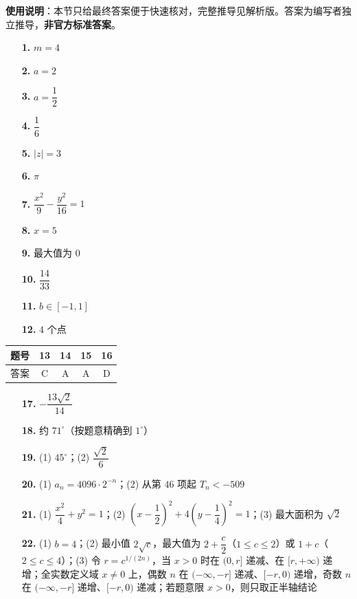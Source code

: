 
\begin{gknotice}
\textbf{使用说明}：本节只给最终答案便于快速核对，完整推导见解析版。答案为编写者独立推导，\textbf{非官方标准答案}。
\end{gknotice}

\begin{itemize}[leftmargin=2.6em]
  \item[\textbf{1.}] $m=4$
  \item[\textbf{2.}] $a=2$
  \item[\textbf{3.}] $a=\dfrac12$
  \item[\textbf{4.}] $\dfrac16$
  \item[\textbf{5.}] $|z|=3$
  \item[\textbf{6.}] $\pi$
  \item[\textbf{7.}] $\dfrac{x^2}{9}-\dfrac{y^2}{16}=1$
  \item[\textbf{8.}] $x=5$
  \item[\textbf{9.}] 最大值为 $0$
  \item[\textbf{10.}] $\dfrac{14}{33}$
  \item[\textbf{11.}] $b\in[-1,1]$
  \item[\textbf{12.}] $4$ 个点
\end{itemize}

\begin{center}\begin{tabular}{ccccc}
\toprule
题号 & 13 & 14 & 15 & 16 \\
\midrule
答案 & C & A & A & D \\
\bottomrule
\end{tabular}\end{center}

\begin{itemize}[leftmargin=2.6em]
  \item[\textbf{17.}] $-\dfrac{13\sqrt2}{14}$
  \item[\textbf{18.}] 约 $71^\circ$（按题意精确到 $1^\circ$）
  \item[\textbf{19.}] (1) $45^\circ$；(2) $\dfrac{\sqrt2}{6}$
  \item[\textbf{20.}] (1) $a_n=4096\cdot2^{-n}$；(2) 从第 $46$ 项起 $T_n<-509$
  \item[\textbf{21.}] (1) $\dfrac{x^2}{4}+y^2=1$；(2) $\left(x-\dfrac12\right)^2+4\left(y-\dfrac14\right)^2=1$；(3) 最大面积为 $\sqrt2$
  \item[\textbf{22.}] (1) $b=4$；(2) 最小值 $2\sqrt c$，最大值为 $2+\dfrac c2$（$1\le c\le2$）或 $1+c$（$2\le c\le4$）；(3) 令 $r=c^{1/(2n)}$，当 $x>0$ 时在 $(0,r]$ 递减、在 $[r,+\infty)$ 递增；全实数定义域 $x\ne0$ 上，偶数 $n$ 在 $(-\infty,-r]$ 递减、$[-r,0)$ 递增，奇数 $n$ 在 $(-\infty,-r]$ 递增、$[-r,0)$ 递减；若题意限 $x>0$，则只取正半轴结论
\end{itemize}
